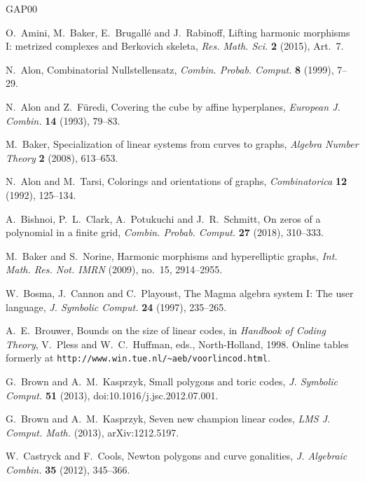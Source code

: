 \documentclass[12pt,letterpaper]{article}
\numberwithin{equation}{section}
\theoremstyle{definition}
\theoremstyle{remark}
\begin{document}
\begingroup\raggedright
\begin{thebibliography}{GAP00}

O.~Amini, M.~Baker, E.~Brugall\'e and J.~Rabinoff, Lifting harmonic morphisms
I: metrized complexes and Berkovich skeleta, \emph{Res. Math. Sci.}
\textbf{2} (2015), Art.~7.

N.~Alon, Combinatorial Nullstellensatz, \emph{Combin. Probab. Comput.}
\textbf{8} (1999), 7--29.

N.~Alon and Z.~F\"uredi, Covering the cube by affine hyperplanes,
\emph{European J. Combin.} \textbf{14} (1993), 79--83.

M.~Baker, Specialization of linear systems from curves to graphs, \emph{Algebra
Number Theory} \textbf{2} (2008), 613--653.

N.~Alon and M.~Tarsi, Colorings and orientations of graphs,
\emph{Combinatorica} \textbf{12} (1992), 125--134.

A.~Bishnoi, P.~L.~Clark, A.~Potukuchi and J.~R.~Schmitt, On zeros of a
polynomial in a finite grid, \emph{Combin. Probab. Comput.} \textbf{27}
(2018), 310--333.

M.~Baker and S.~Norine, Harmonic morphisms and hyperelliptic graphs,
\emph{Int. Math. Res. Not. IMRN} (2009), no.~15, 2914--2955.

W.~Bosma, J.~Cannon and C.~Playoust, The Magma algebra system I: The user
language, \emph{J. Symbolic Comput.} \textbf{24} (1997), 235--265.

A.~E.~Brouwer, Bounds on the size of linear codes, in \emph{Handbook of
Coding Theory}, V.~Pless and W.~C.~Huffman, eds., North-Holland, 1998. Online
tables formerly at \texttt{http://www.win.tue.nl/\~{}aeb/voorlincod.html}.

G.~Brown and A.~M.~Kasprzyk, Small polygons and toric codes, \emph{J.
Symbolic Comput.} \textbf{51} (2013), doi:10.1016/j.jsc.2012.07.001.

G.~Brown and A.~M.~Kasprzyk, Seven new champion linear codes, \emph{LMS J.
Comput. Math.} (2013), arXiv:1212.5197.

W.~Castryck and F.~Cools, Newton polygons and curve gonalities, \emph{J.
Algebraic Combin.} \textbf{35} (2012), 345--366.


\end{thebibliography}
\end{document}
